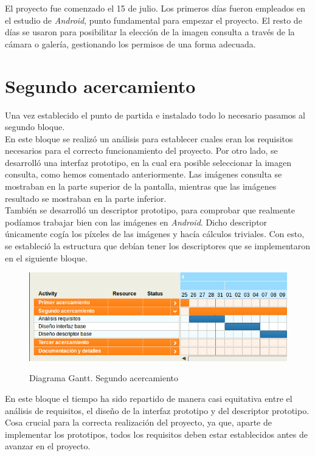 El proyecto fue comenzado el 15 de julio. Los primeros días fueron empleados en el estudio de \textit{Android}, punto fundamental para empezar el proyecto. El resto de días se usaron para posibilitar la elección de la imagen consulta a través de la cámara o galería, gestionando los permisos de una forma adecuada.

\section{Segundo acercamiento}

Una vez establecido el punto de partida e instalado todo lo necesario pasamos al segundo bloque.\\

En este bloque se realizó un análisis para establecer cuales eran los requisitos necesarios para el correcto funcionamiento del proyecto.
Por otro lado, se desarrolló una interfaz prototipo, en la cual era posible seleccionar la imagen consulta, como hemos comentado anteriormente. Las imágenes consulta se mostraban en la parte superior de la pantalla, mientras que las imágenes resultado se mostraban en la parte inferior.\\

También se desarrolló un descriptor prototipo, para comprobar que realmente podíamos trabajar bien con las imágenes en \textit{Android}. Dicho descriptor únicamente cogía los píxeles de las imágenes y hacía cálculos triviales. Con esto, se estableció la estructura que debían tener los descriptores que se implementaron en el siguiente bloque.

\begin{figure}[H] %
\centering
\includegraphics[scale=0.5]{imagenes/gant2.png}  %
\label{gant2.png}
\caption{Diagrama Gantt. Segundo acercamiento}
\end{figure}

En este bloque el tiempo ha sido repartido de manera casi equitativa entre el análisis de requisitos, el diseño de la interfaz prototipo y del descriptor prototipo. Cosa crucial para la correcta realización del proyecto, ya que, aparte de implementar los prototipos, todos los requisitos deben estar establecidos antes de avanzar en el proyecto.\\

